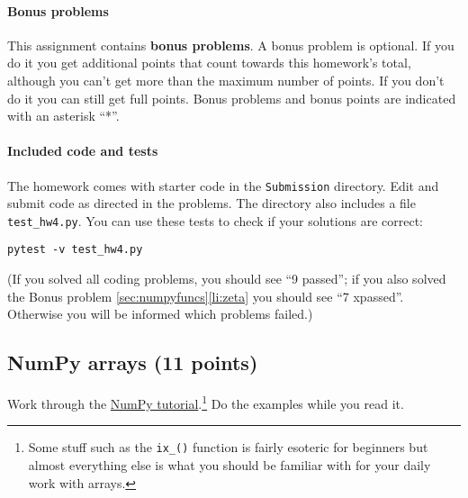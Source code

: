 \documentclass[letterpaper]{scrartcl}
\begin{document}
\paragraph{Bonus problems}

This assignment contains \textbf{bonus problems}. A bonus problem is
optional. If you do it you get additional points that count towards
this homework's total, although you can't get more than the maximum
number of points. If you don't do it you can still get full
points. Bonus problems and bonus points are indicated with an asterisk
``*''.

\paragraph{Included code and tests}

The homework comes with starter code in the \texttt{Submission}
directory. Edit and submit code as directed in the problems. The
directory also includes a file \texttt{test\_hw4.py}. You can use these
tests to check if your solutions are correct:
\begin{verbatim}
pytest -v test_hw4.py
\end{verbatim}
(If you solved all coding problems, you should see ``9 passed''; if
you also solved the Bonus problem \ref{sec:numpyfuncs}\ref{li:zeta}
you should see ``7 xpassed''. Otherwise you will be informed which
problems failed.)


\subsection{NumPy arrays (11 points)}

Work through the
\href{https://docs.scipy.org/doc/numpy-dev/user/quickstart.html}{NumPy
  tutorial}.\footnote{Some stuff such as the \texttt{ix\_()} function
  is fairly esoteric for beginners but almost everything else is what
  you should be familiar with for your daily work with arrays.} Do
the examples while you read it.
\end{document}
